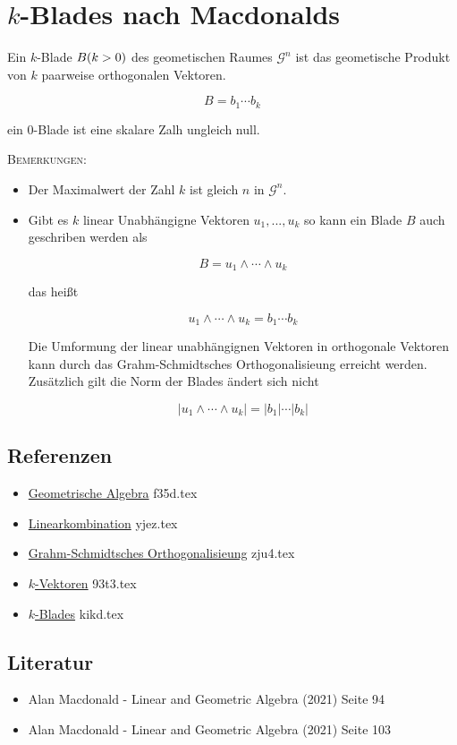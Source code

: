 \documentclass{sajzk}
\begin{document}
\section{\texorpdfstring{\texorpdfstring{$k$-Blades nach Macdonalds}{k-Blades nach Macdonalds}}{k-Blades}}
\label{9o91}
Ein $k$-Blade $B\space(k>0)$ des geometischen Raumes $\mathscr{G}^n$ ist das
geometische Produkt von $k$ paarweise orthogonalen Vektoren.

\[
B=b_1\cdots b_k
\]

ein $0$-Blade ist eine skalare Zalh ungleich null.

\textsc{Bemerkungen:}

\begin{itemize}
    \item Der Maximalwert der Zahl $k$ ist gleich $n$ in $\mathscr{G}^n$.
    \item Gibt es $k$ linear Unabhängigne Vektoren $u_1, ..., u_k$ so kann ein Blade $B$
          auch geschriben werden als

  \[
  B = u_1 \wedge \cdots \wedge u_k
  \]

  das heißt

\[
u_1 \wedge \cdots \wedge u_k = b_1 \cdots b_k
\]

  Die Umformung der linear unabhängignen Vektoren in orthogonale Vektoren kann
  durch das Grahm-Schmidtsches Orthogonalisieung erreicht werden. Zusätzlich
  gilt die Norm der Blades ändert sich nicht
  
\[
  |u_1 \wedge \cdots \wedge u_k| = |b_1| \cdots |b_k|
\]
\end{itemize}
\subsection{Referenzen}
\begin{itemize}
    \item \href{f35d.pdf}{Geometrische Algebra} f35d.tex
    \item \href{yjez.pdf}{Linearkombination} yjez.tex
    \item \href{zju4.pdf}{Grahm-Schmidtsches Orthogonalisieung} zju4.tex
    \item \href{93t3.pdf}{$k$-Vektoren} 93t3.tex
    \item \href{kikd.pdf}{$k$-Blades} kikd.tex
\end{itemize}

\subsection{Literatur}
\begin{itemize}
    \item Alan Macdonald - Linear and Geometric Algebra (2021) Seite 94
    \item Alan Macdonald - Linear and Geometric Algebra (2021) Seite 103
\end{itemize}
\end{document}
